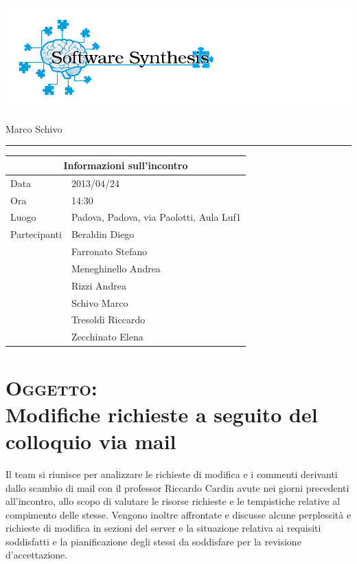\documentclass[a4paper,10pt,openright]{article}
\begin{document}
\includegraphics[width=1.5\textwidth]{logo}

\begin{center}

\begin{Large}
\hspace{1.2cm}{Verbale d'incontro 2013/04/24}
\newline
\end{Large}

\begin{small}
	Marco Schivo
\end{small}

\noindent\rule{\textwidth}{0.4pt}
\newline

\begin{tabular}{ll}
\toprule
\multicolumn{2}{c}{\sffamily Informazioni sull'incontro}\\
\midrule
Data & 2013/04/24 \\
Ora & 14:30 \\
Luogo & Padova, Padova, via Paolotti, Aula Luf1 \\
Partecipanti & Beraldin Diego \\ & Farronato Stefano \\ & Meneghinello Andrea \\ & Rizzi Andrea \\ & Schivo Marco \\ & Tresoldi Riccardo \\ & Zecchinato Elena\\
\bottomrule
\end{tabular}

\end{center}

\section*{{\textsc{Oggetto:} \\Modifiche richieste a seguito del colloquio via mail}}
Il team si riunisce per analizzare le richieste di modifica e i commenti derivanti dallo scambio di mail con il professor Riccardo Cardin avute nei giorni precedenti all'incontro, allo scopo di valutare le risorse richieste e le tempistiche relative al compimento delle stesse.
Vengono inoltre affrontate e discusse alcune perplessità e richieste di modifica in sezioni del server e la situazione relativa ai requisiti soddisfatti e la pianificazione degli stessi da soddisfare per la revisione d'accettazione.
\end{document}
